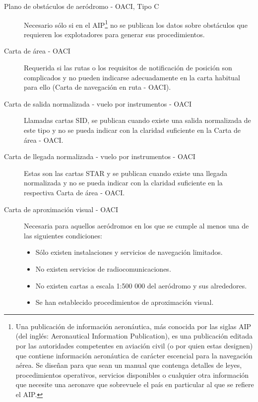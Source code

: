 \begin{description}

\item [Plano de obst\'aculos de aer\'odromo - OACI, Tipo C] Necesario s\'olo
  si en el AIP\footnote{Una publicación de información aeronáutica, más conocida por las siglas AIP (del inglés: Aeronautical Information Publication), es una publicación editada por las autoridades competentes en aviación civil (o por quien estas designen) que contiene información aeronáutica de carácter escencial para la navegación aérea. Se diseñan para que sean un manual que contenga detalles de leyes, procedimientos operativos, servicios disponibles o cualquier otra información que necesite una aeronave que sobrevuele el país en particular al que se refiere el AIP.}
 no se publican los datos sobre obst\'aculos que requieren
  los explotadores para generar sus procedimientos.

  \item [Carta de \'area - OACI] Requerida si las rutas o los requisitos de
  notificaci\'on de posici\'on son complicados y no pueden indicarse
  adecuadamente en la carta habitual para ello (Carta de navegaci\'on en
  ruta - OACI).

  \item [Carta de salida normalizada - vuelo por instrumentos - OACI]
  Llamadas cartas SID, se publican cuando existe una salida
  normalizada de este tipo y no se pueda indicar con la claridad
  suficiente en la Carta de \'area - OACI.

  \item [Carta de llegada normalizada - vuelo por instrumentos - OACI]
  Estas son las cartas STAR y se publican cuando existe una llegada
  normalizada y no se pueda indicar con la claridad suficiente en la
  respectiva Carta de \'area - OACI.

  \item [Carta de aproximaci\'on visual - OACI] Necesaria para aquellos
  aer\'odromos en los que se cumple al menos una de las siguientes
  condiciones:

  \begin{itemize}
  \item  S\'olo existen instalaciones y servicios de navegaci\'on limitados.

    \item No existen servicios de radiocomunicaciones.

    \item No existen cartas a escala 1:500 000 del aer\'odromo y sus
    alrededores.

    \item Se han establecido procedimientos de aproximaci\'on visual.
  \end{itemize}

\end{description}

